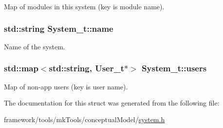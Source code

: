 Map of modules in this system (key is module name). 

\subsubsection[{\texorpdfstring{name}{name}}]{\setlength{\rightskip}{0pt plus 5cm}std\+::string System\+\_\+t\+::name}\hypertarget{struct_system__t_af6e6ba67877c62c0b3f9bcc468e822ed}{}\label{struct_system__t_af6e6ba67877c62c0b3f9bcc468e822ed}


Name of the system. 

\subsubsection[{\texorpdfstring{users}{users}}]{\setlength{\rightskip}{0pt plus 5cm}std\+::map$<$std\+::string, {\bf User\+\_\+t}$\ast$$>$ System\+\_\+t\+::users}\hypertarget{struct_system__t_abd903872c2c0a057976fbc82431ab9f8}{}\label{struct_system__t_abd903872c2c0a057976fbc82431ab9f8}


Map of non-\/app users (key is user name). 



The documentation for this struct was generated from the following file\+:\begin{DoxyCompactItemize}
\item 
framework/tools/mk\+Tools/conceptual\+Model/\hyperlink{tools_2mk_tools_2conceptual_model_2system_8h}{system.\+h}\end{DoxyCompactItemize}
